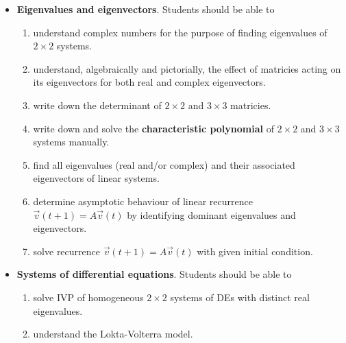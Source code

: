 \documentclass[../main.tex]{subfiles}
\begin{document}
\begin{itemize}
   \item \textbf{Eigenvalues and eigenvectors}. Students should be able to
     \begin{enumerate}
       \item understand complex numbers for the purpose of finding eigenvalues of \(2 \times 2\) systems.
       \item understand, algebraically and pictorially, the effect of matricies acting on its eigenvectors for both real and complex eigenvectors.
       \item write down the determinant of \(2 \times 2\) and \(3 \times 3\) matricies.
       \item write down and solve the \textbf{characteristic polynomial} of \(2 \times 2\) and \(3 \times 3\) systems manually.
       \item find all eigenvalues (real and/or complex) and their associated eigenvectors of linear systems.
       \item determine asymptotic behaviour of linear recurrence \(\vec{v}(t+1) = A \vec{v}(t)\) by identifying dominant eigenvalues and eigenvectors.
       \item solve recurrence \(\vec{v}(t+1) = A \vec{v}(t)\) with given initial condition.
     \end{enumerate}

   \item \textbf{Systems of differential equations}. Students should be able to 
     \begin{enumerate}
       \item solve IVP of homogeneous \(2 \times 2\) systems of DEs with distinct real eigenvalues.
       \item understand the Lokta-Volterra model.
     \end{enumerate}
\end{itemize}
\clearpage
\end{document}
